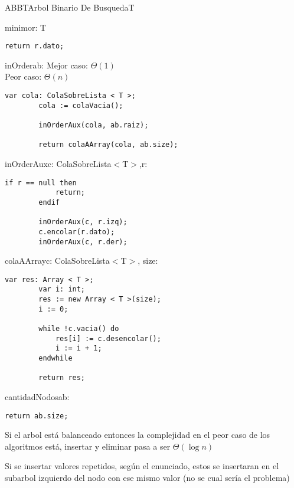 \begin{module}{ABB}{T}{Arbol Binario De Busqueda}{T}
\begin{proc}{minimo}{\In r: \nodo}{T}
\begin{lstlisting}[numbers=none,frame=none]
		return r.dato;
		\end{lstlisting}
	\end{proc}

	\begin{proc}{inOrder}{\In ab: \moduletype}{}
		Mejor caso: $\Theta(1)$\\
		Peor caso: $\Theta(n)$
		\begin{lstlisting}[numbers=none,frame=none]
		var cola: ColaSobreLista < T >;
		cola := colaVacia();

		inOrderAux(cola, ab.raiz);

		return colaAArray(cola, ab.size);
		\end{lstlisting}
	\end{proc}

	\begin{proc}{inOrderAux}{\Inout c: ColaSobreLista$<$T$>$,\In r: \nodo}{}
		\begin{lstlisting}[numbers=none,frame=none]
		if r == null then
			return;
		endif

		inOrderAux(c, r.izq);
		c.encolar(r.dato);
		inOrderAux(c, r.der);
		\end{lstlisting}
	\end{proc}

	\begin{proc}{colaAArray}{\Inout c: ColaSobreLista$<$T$>$, \In size: \Int}{}
		\begin{lstlisting}[numbers=none,frame=none]
		var res: Array < T >;
		var i: int;
		res := new Array < T >(size);
		i := 0;

		while !c.vacia() do
			res[i] := c.desencolar();
			i := i + 1;
		endwhile

		return res;
		\end{lstlisting}
	\end{proc}

	\begin{proc}{cantidadNodos}{\In ab: \moduletype}{\Int}
		\begin{lstlisting}[numbers=none,frame=none]
		return ab.size;
		\end{lstlisting}
	\end{proc}
\end{module}

Si el arbol está balanceado entonces la complejidad en el peor caso de los algoritmos está, insertar y eliminar pasa a ser $\Theta(\log{n})$
\medskip

Si se insertar valores repetidos, según el enunciado, estos se insertaran en el subarbol izquierdo del nodo con ese mismo valor (no se cual sería el problema)

